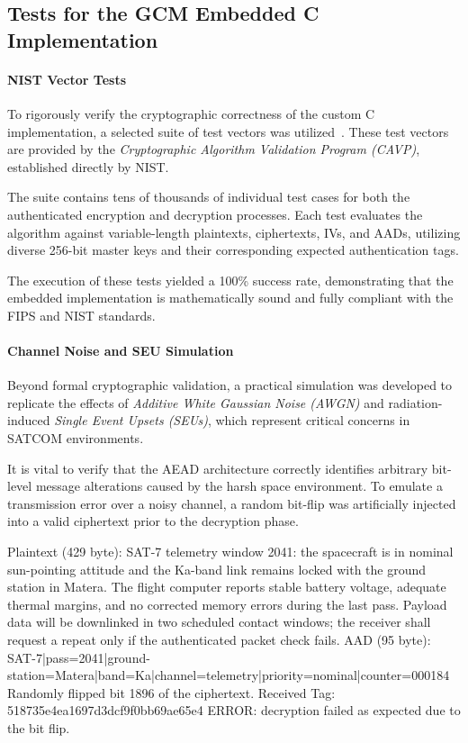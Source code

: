 \documentclass[11pt,a4paper]{report}
\begin{document}
\subsection{Tests for the GCM Embedded C Implementation}

\paragraph{NIST Vector Tests}
To rigorously verify the cryptographic correctness of the custom C implementation, a selected suite of test vectors was utilized~\cite{vectorTests}. 
These test vectors are provided by the \textit{Cryptographic Algorithm Validation Program (CAVP)}, established directly by NIST. 

The suite contains tens of thousands of individual test cases for both the authenticated encryption and decryption processes. 
Each test evaluates the algorithm against variable-length plaintexts, ciphertexts, IVs, and AADs, utilizing diverse 256-bit master keys and their corresponding expected authentication tags. 

The execution of these tests yielded a 100\% success rate, demonstrating that the embedded implementation is mathematically sound and fully compliant with the FIPS and NIST standards.

\paragraph{Channel Noise and SEU Simulation}
Beyond formal cryptographic validation, a practical simulation was developed to replicate the effects of \textit{Additive White Gaussian Noise (AWGN)} and radiation-induced \textit{Single Event Upsets (SEUs)}, which represent critical concerns in SATCOM environments. 

It is vital to verify that the AEAD architecture correctly identifies arbitrary bit-level message alterations caused by the harsh space environment. 
To emulate a transmission error over a noisy channel, a random bit-flip was artificially injected into a valid ciphertext prior to the decryption phase. 

\begin{lightterminal}
Plaintext (429 byte): SAT-7 telemetry window 2041: the spacecraft is in nominal sun-pointing attitude and the Ka-band link remains locked with the ground station in Matera. The flight computer reports stable battery voltage, adequate thermal margins, and no corrected memory errors during the last pass. Payload data will be downlinked in two scheduled contact windows; the receiver shall request a repeat only if the authenticated packet check fails.
AAD (95 byte): SAT-7|pass=2041|ground-station=Matera|band=Ka|channel=telemetry|priority=nominal|counter=000184
Randomly flipped bit 1896 of the ciphertext.
Received Tag: 518735e4ea1697d3dcf9f0bb69ae65e4
ERROR: decryption failed as expected due to the bit flip.
\end{lightterminal}
\end{document}
